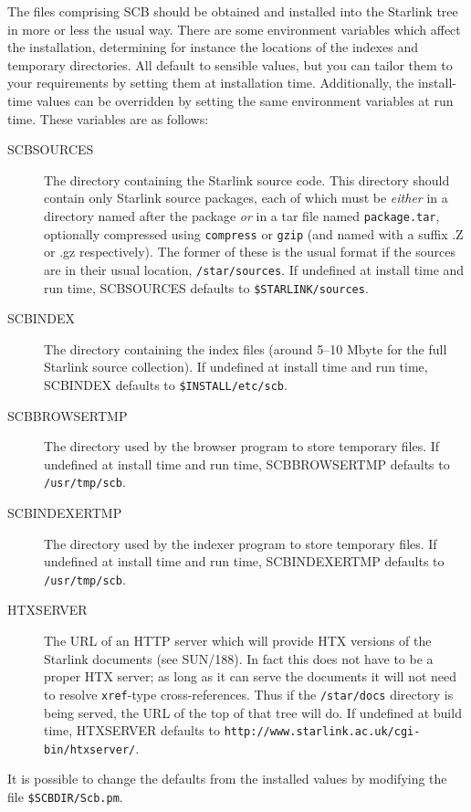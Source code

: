 \documentclass[twoside,11pt]{article}
\newcommand{\xref}[3]{#1}
\renewcommand{\_}{\texttt{\symbol{95}}}
\begin{document}
The files comprising SCB should be obtained and installed into
the Starlink tree in more or less the usual way.
There are some environment variables which affect the
installation, determining for instance the locations of the 
indexes and temporary directories.  
All default to sensible values, but
you can tailor them to your requirements by setting them at 
installation time.
Additionally, the install-time values can be overridden by
setting the same environment variables at run time.
These variables are as follows:
\begin{description}
\item[SCB\_SOURCES]
The directory containing the Starlink source code.  
This directory should contain only Starlink source packages,
each of which must be {\em either\/} in a directory named after the package
{\em or\/} in a tar file named {\tt package.tar}, optionally compressed
using {\tt compress} or {\tt gzip} (and named with a suffix .Z or .gz 
respectively).
The former of these is the usual format if the sources are in
their usual location, {\tt /star/sources}.
If undefined at install time and run time, SCB\_SOURCES 
defaults to {\tt \$STARLINK/sources}.
\item[SCB\_INDEX]
The directory containing the index files (around 5--10 Mbyte for the full
Starlink source collection).
If undefined at install time and run time, SCB\_INDEX defaults to
{\tt \$INSTALL/etc/scb}.
\item[SCB\_BROWSER\_TMP]
The directory used by the browser program to store temporary files. 
If undefined at install time and run time, SCB\_BROWSER\_TMP defaults to
{\tt /usr/tmp/scb}.
\item[SCB\_INDEXER\_TMP]
The directory used by the indexer program to store temporary files. 
If undefined at install time and run time, SCB\_INDEXER\_TMP defaults to
{\tt /usr/tmp/scb}.
\item[HTX\_SERVER]
The URL of an HTTP server which will provide HTX versions of the Starlink
documents (see \xref{SUN/188}{sun188}{remote_document_servers}).
In fact this does not have to be a proper HTX server; as long as it
can serve the documents it will not need to resolve {\tt xref\_}-type 
cross-references.
Thus if the {\tt /star/docs} directory is being served, the URL of
the top of that tree will do.
If undefined at build time, HTX\_SERVER defaults to 
{\tt http://www.starlink.ac.uk/cgi-bin/htxserver/}.
\end{description}
It is possible to change the defaults from the installed values by
modifying the file {\tt \$SCB\_DIR/Scb.pm}.
\end{document}
